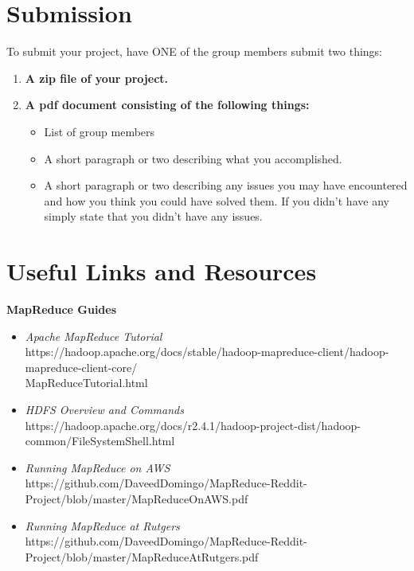 \documentclass{article}
\begin{document}

\section*{Submission } 
To submit your project, have ONE of the group members submit two things:

\begin{enumerate}
\item \textbf{A zip file of your project.} 
\item \textbf{A pdf document consisting of the following things:}
	\begin{itemize}
	\item List of group members
	\item A short paragraph or two describing what you accomplished.
	\item A short paragraph or two describing any issues you may have encountered and how you think you could have solved them. If you didn't have any simply state that you didn't have any issues.
	\end{itemize}
\end{enumerate}




\section*{Useful Links and Resources} %
\textbf{MapReduce Guides}
\begin{itemize}
    \item \textit{Apache MapReduce Tutorial}\\ https://hadoop.apache.org/docs/stable/hadoop-mapreduce-client/hadoop-mapreduce-client-core/\\MapReduceTutorial.html
    \item \textit{HDFS Overview and Commands}\\ https://hadoop.apache.org/docs/r2.4.1/hadoop-project-dist/hadoop-common/FileSystemShell.html
    \item \textit{Running MapReduce on AWS}\\ https://github.com/DaveedDomingo/MapReduce-Reddit-Project/blob/master/MapReduceOnAWS.pdf
    \item \textit{Running MapReduce at Rutgers}\\ https://github.com/DaveedDomingo/MapReduce-Reddit-Project/blob/master/MapReduceAtRutgers.pdf
\end{itemize}
\end{document}
